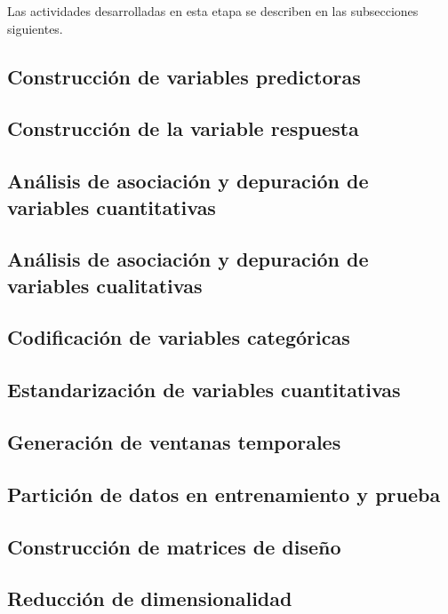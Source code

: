Las actividades desarrolladas en esta etapa se describen en las subsecciones siguientes.

\subsection{Construcción de variables predictoras}

\subsection{Construcción de la variable respuesta}

\subsection{Análisis de asociación y depuración de variables cuantitativas}

\subsection{Análisis de asociación y depuración de variables cualitativas}

\subsection{Codificación de variables categóricas}

\subsection{Estandarización de variables cuantitativas}

\subsection{Generación de ventanas temporales}

\subsection{Partición de datos en entrenamiento y prueba}

\subsection{Construcción de matrices de diseño}

\subsection{Reducción de dimensionalidad}

